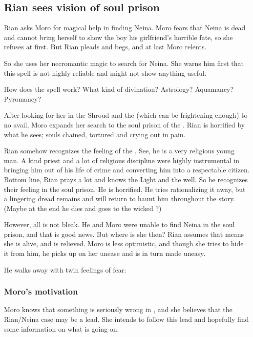 \subsection{Rian sees vision of soul prison}
Rian asks Moro \Cobrel{} for magical help in finding Neina. Moro fears that Neina is dead and cannot bring herself to show the boy his girlfriend's horrible fate, so she refuses at first. But Rian pleads and begs, and at last Moro relents. 

So she uses her necromantic magic to search for Neina. She warns him first that this spell is not highly reliable and might not show anything useful. 

How does the spell work? What kind of divination? Astrology? Aquamancy? Pyromancy? 

After looking for her in the Shroud and the \Wylde{} (which can be frightening enough) to no avail, Moro expands her search to the soul prison of the \Sephiroth{}. Rian is horrified by what he sees; souls chained, tortured and crying out in pain. 

Rian somehow recognizes the feeling of the \Sephiroth. See, he is a very religious young man. A kind priest and a lot of religious discipline were highly instrumental in bringing him out of his life of crime and converting him into a respectable citizen. Bottom line, Rian prays a lot and knows the Light and the \Sephiroth{} well. So he recognizes their feeling in the soul prison. He is horrified. He tries rationalizing it away, but a lingering dread remains and will return to haunt him throughout the story. (Maybe at the end he dies and goes to the wicked \Sephiroth?) 

However, all is not bleak. He and Moro were unable to find Neina in the soul prison, and that is good news. But where is she then? Rian assumes that means she is alive, and is relieved. Moro is less optimistic, and though she tries to hide it from him, he picks up on her unease and is in turn made uneasy. 

He walks away with twin feelings of fear: 







\subsubsection{Moro's motivation}
Moro knows that something is seriously wrong in \Malcur, and she believes that the Rian/Neina case may be a lead. 
She intends to follow this lead and hopefully find some information on what is going on. 


